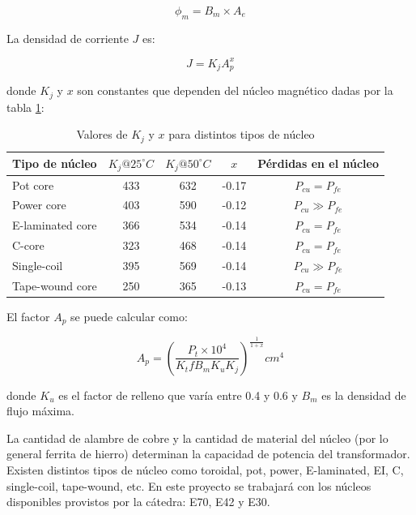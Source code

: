 $$ \phi_{m}=B_{m} \times A_{e} $$

La densidad de corriente $J$ es:

$$ J=K_jA_p^x $$

donde $K_j$ y $x$ son constantes que dependen del núcleo magnético dadas por la tabla \ref{tabla:Kj}:

\begin{table}[]
    \begin{tabular}{lcccc}
        \hline
        Tipo de núcleo   & $K_j @ 25^{\circ} C$ & $K_j @ 50^{\circ} C$ & $x$   & Pérdidas en el núcleo \\ \hline
        Pot core         & 433                  & 632                  & -0.17 & $P_{cu}=P_{fe}$       \\
        Power core       & 403                  & 590                  & -0.12 & $P_{cu}\gg P_{fe}$    \\
        E-laminated core & 366                  & 534                  & -0.14 & $P_{cu}=P_{fe}$       \\
        C-core           & 323                  & 468                  & -0.14 & $P_{cu}=P_{fe}$       \\
        Single-coil      & 395                  & 569                  & -0.14 & $P_{cu}\gg P_{fe}$    \\
        Tape-wound core  & 250                  & 365                  & -0.13 & $P_{cu}=P_{fe}$       \\ \hline
    \end{tabular}
    \caption{Valores de $K_j$ y $x$ para distintos tipos de núcleo}
    \label{tabla:Kj}
\end{table}

El factor $A_{p}$ se puede calcular como: 

$$ A_{p}=\left(\frac{P_{t} \times 10^{4}}{K_{t} f B_{m} K_{u} K_{j}}\right)^{\frac{1}{1+x}} {cm}^{4} $$

donde $K_u$ es el factor de relleno que varía entre 0.4 y 0.6 y $B_m$ es la densidad de flujo máxima.

La cantidad de alambre de cobre y la cantidad de material del núcleo (por lo general ferrita de hierro) determinan la capacidad de potencia del transformador. 
Existen distintos tipos de núcleo como toroidal, pot, power, E-laminated, EI, C, single-coil, tape-wound, etc. 
En este proyecto se trabajará con los núcleos disponibles provistos por la cátedra: E70, E42 y E30. 

